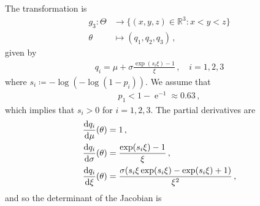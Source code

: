 \documentclass{article}
\newcommand{\R}{\mathbb{R}}
\newcommand{\dd}{{\rm d}}
\begin{document}
%
The transformation is
%
\begin{align*}
	g_3 \colon \Theta &\to \{(x, y, z) \in \R^3 \colon x < y < z\} \\
	\theta &\mapsto (q_{1}, q_{2}, q_{3}) \,,
\end{align*}
%
given by
%
\begin{align*}
	q_i = \mu + \sigma \frac{\exp(s_i \xi) - 1}{\xi} \,, \quad i = 1, 2, 3
\end{align*}
%
where $s_i \coloneqq -\log(-\log(1 - p_i))$.
We assume that
%
\begin{align*}
	p_1 < 1 - \operatorname{e} ^ {-1} \approx 0.63 \,,
\end{align*}
%
which implies that $s_i > 0$ for $i = 1, 2, 3$.
The partial derivatives are
%
\begin{align}
	\frac{\dd q_{i}}{\dd \mu}(\theta)
		&= 1 \,,
	\label{eq:q_i-derivatives-1} \\
	\frac{\dd q_{i}}{\dd \sigma}(\theta)
		&= \frac{\exp(s_i \xi) - 1}{\xi} \,,\\
	\frac{\dd q_{i}}{\dd \xi}(\theta)
		&= \frac{\sigma(s_i \xi \exp(s_i \xi)
		- \exp(s_i \xi) + 1)}{\xi ^ 2} \,,
	\label{eq:q_i-derivatives-2}
\end{align}
%
and so the determinant of the Jacobian is
%
\end{document}
